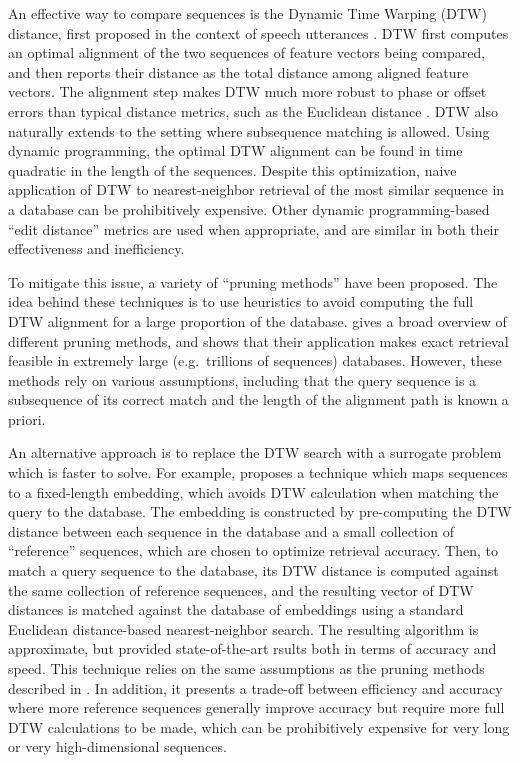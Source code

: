 \documentclass{article}
\begin{document}
An effective way to compare sequences is the Dynamic Time Warping (DTW) distance, first proposed in the context of speech utterances \cite{sakoe1978dynamic}.
DTW first computes an optimal alignment of the two sequences of feature vectors being compared, and then reports their distance as the total distance among aligned feature vectors.
The alignment step makes DTW much more robust to phase or offset errors than typical distance metrics, such as the Euclidean distance \cite{rakthanmanon2012searching}.
DTW also naturally extends to the setting where subsequence matching is allowed.
Using dynamic programming, the optimal DTW alignment can be found in time quadratic in the length of the sequences.
Despite this optimization, naive application of DTW to nearest-neighbor retrieval of the most similar sequence in a database can be prohibitively expensive.
Other dynamic programming-based ``edit distance'' metrics are used when appropriate, and are similar in both their effectiveness and inefficiency.

To mitigate this issue, a variety of ``pruning methods'' have been proposed.
The idea behind these techniques is to use heuristics to avoid computing the full DTW alignment for a large proportion of the database.
\cite{rakthanmanon2012searching} gives a broad overview of different pruning methods, and shows that their application makes exact retrieval feasible in extremely large (e.g.\ trillions of sequences) databases.
However, these methods rely on various assumptions, including that the query sequence is a subsequence of its correct match and the length of the alignment path is known a priori.

An alternative approach is to replace the DTW search with a surrogate problem which is faster to solve.
For example, \cite{papapetrou2011embedding} proposes a technique which maps sequences to a fixed-length embedding, which avoids DTW calculation when matching the query to the database.
The embedding is constructed by pre-computing the DTW distance between each sequence in the database and a small collection of ``reference'' sequences, which are chosen to optimize retrieval accuracy.
Then, to match a query sequence to the database, its DTW distance is computed against the same collection of reference sequences, and the resulting vector of DTW distances is matched against the database of embeddings using a standard Euclidean distance-based nearest-neighbor search.
The resulting algorithm is approximate, but provided state-of-the-art rsults both in terms of accuracy and speed.
This technique relies on the same assumptions as the pruning methods described in \cite{rakthanmanon2012searching}.
In addition, it presents a trade-off between efficiency and accuracy where more reference sequences generally improve accuracy but require more full DTW calculations to be made, which can be prohibitively expensive for very long or very high-dimensional sequences.
\end{document}

